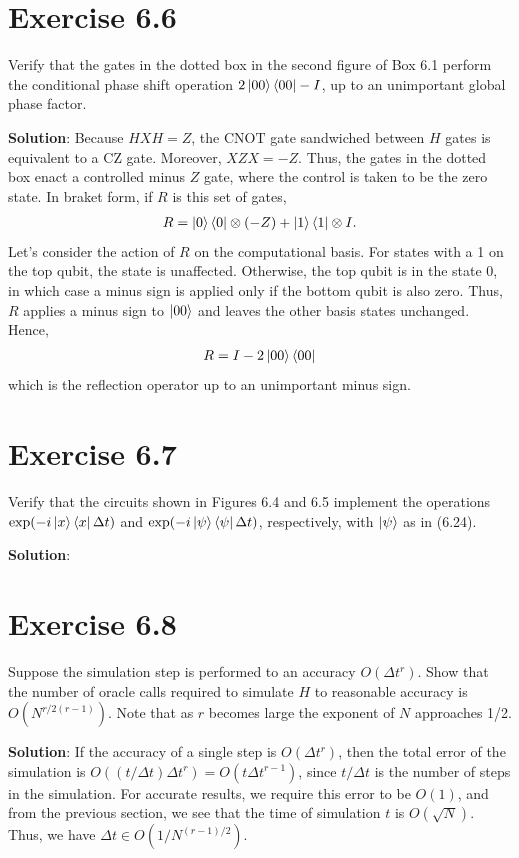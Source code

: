 \documentclass{book}
\begin{document}
    \section*{Exercise 6.6} 
        Verify that the gates in the dotted box in the second figure of Box 6.1 perform the conditional phase shift operation $2\ket{00}\bra{00}-I$, up to an unimportant global phase factor.
        
        \textbf{Solution}: Because $HXH = Z$, the $\mathrm{CNOT}$ gate sandwiched between $H$ gates is equivalent to a CZ gate. Moreover, $XZX = -Z$. Thus, the gates in the dotted box enact a controlled minus $Z$ gate, where the control is taken to be the zero state. In braket form, if $R$ is this set of gates,
        \begin{align}
            R = \ket{0}\bra{0} \otimes (-Z) + \ket{1}\bra{1}\otimes I.
        \end{align}
        Let's consider the action of $R$ on the computational basis. For states with a 1 on the top qubit, the state is unaffected. Otherwise, the top qubit is in the state 0, in which case a minus sign is applied only if the bottom qubit is also zero. Thus, $R$ applies a minus sign to $\ket{00}$ and leaves the other basis states unchanged. Hence,
        \begin{align}
            R = I - 2\ket{00}\bra{00}
        \end{align}
        which is the reflection operator up to an unimportant minus sign. 
    
    \section*{Exercise 6.7}
        Verify that the circuits shown in Figures 6.4 and 6.5 implement the operations $\exp(-i\ket{x}\bra{x}\Delta t)$ and $\exp(-i\ket{\psi}\bra{\psi}\Delta t)$, respectively, with $\ket{\psi}$ as in (6.24).
        
        \textbf{Solution}:
    
    \section*{Exercise 6.8}
        Suppose the simulation step is performed to an accuracy $O(\Delta t^r)$. Show that the number of oracle calls required to simulate $H$ to reasonable accuracy is $O(N^{r/2(r-1)})$. Note that as $r$ becomes large the exponent of $N$ approaches 1/2.
        
        \textbf{Solution}: If the accuracy of a single step is $O(\Delta t^r)$, then the total error of the simulation is $O((t/\Delta t) \Delta t^r)=O(t\Delta t^{r-1})$, since $t/\Delta t$ is the number of steps in the simulation. For accurate results, we require this error to be $O(1)$, and from the previous section, we see that the time of simulation $t$ is $O(\sqrt{N})$. Thus, we have $\Delta t \in O(1/N^{(r-1)/2})$. 
    
\end{document}
